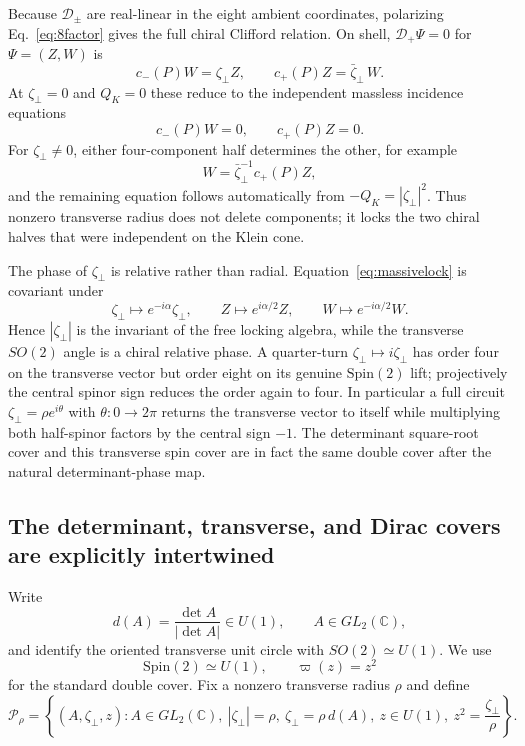 \documentclass[11pt]{article}
\theoremstyle{definition}\newtheorem{definition}[theorem]{Definition}
\theoremstyle{remark}\newtheorem{remark}[theorem]{Remark}\newtheorem{conjecture}[theorem]{Conjecture}
\begin{document}
Because $\mathcal D_\pm$ are real-linear in the eight ambient coordinates, polarizing Eq.~\eqref{eq:8factor} gives the full chiral Clifford relation. On shell, $\mathcal D_+\Psi=0$ for $\Psi=(Z,W)$ is
\begin{equation}\label{eq:massivelock}
 c_-(P)W=\zeta_\perp Z,\qquad
 c_+(P)Z=\bar\zeta_\perp\,W.
\end{equation}
At $\zeta_\perp=0$ and $Q_K=0$ these reduce to the independent massless incidence equations
\begin{equation}
 c_-(P)W=0,\qquad c_+(P)Z=0.
\end{equation}
For $\zeta_\perp\neq0$, either four-component half determines the other, for example
\begin{equation}
 W=\bar\zeta_\perp^{-1}c_+(P)Z,
\end{equation}
and the remaining equation follows automatically from $-Q_K=|\zeta_\perp|^2$. Thus nonzero transverse radius does not delete components; it locks the two chiral halves that were independent on the Klein cone.

The phase of $\zeta_\perp$ is relative rather than radial. Equation~\eqref{eq:massivelock} is covariant under
\begin{equation}
 \zeta_\perp\mapsto e^{-i\alpha}\zeta_\perp,\qquad
 Z\mapsto e^{i\alpha/2}Z,\qquad
 W\mapsto e^{-i\alpha/2}W.
\end{equation}
Hence $|\zeta_\perp|$ is the invariant of the free locking algebra, while the transverse $SO(2)$ angle is a chiral relative phase. A quarter-turn $\zeta_\perp\mapsto i\zeta_\perp$ has order four on the transverse vector but order eight on its genuine $\mathrm{Spin}(2)$ lift; projectively the central spinor sign reduces the order again to four. In particular a full circuit $\zeta_\perp=\rho e^{i\theta}$ with $\theta:0\to2\pi$ returns the transverse vector to itself while multiplying both half-spinor factors by the central sign $-1$. The determinant square-root cover and this transverse spin cover are in fact the same double cover after the natural determinant-phase map.

\subsection{The determinant, transverse, and Dirac covers are explicitly intertwined}\label{subsec:threecover}
Write
\begin{equation}\label{eq:detphase}
 d(A)=\frac{\det A}{|\det A|}\in U(1),\qquad A\in GL_2(\mathbb C),
\end{equation}
and identify the oriented transverse unit circle with $SO(2)\simeq U(1)$. We use
\begin{equation}
 \mathrm{Spin}(2)\simeq U(1),\qquad \varpi(z)=z^2
\end{equation}
for the standard double cover. Fix a nonzero transverse radius $\rho$ and define
\begin{equation}\label{eq:pullbackspincover}
 \mathcal P_\rho=
 \left\{(A,\zeta_\perp,z):
 A\in GL_2(\mathbb C),\ |\zeta_\perp|=\rho,\ \zeta_\perp=\rho\,d(A),\ z\in U(1),\ z^2=\frac{\zeta_\perp}{\rho}
 \right\}.
\end{equation}
\end{document}
